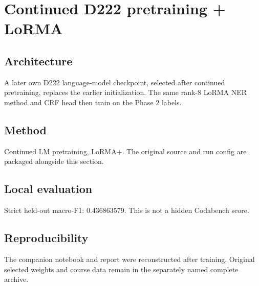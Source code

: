\section{Continued D222 pretraining + LoRMA}
\subsection{Architecture}
A later own D222 language-model checkpoint, selected after continued pretraining, replaces the earlier initialization. The same rank-8 LoRMA NER method and CRF head then train on the Phase 2 labels.
\subsection{Method}
Continued LM pretraining, LoRMA+. The original source and run config are packaged alongside this section.
\subsection{Local evaluation}
Strict held-out macro-F1: 0.436863579. This is not a hidden Codabench score.
\subsection{Reproducibility}
The companion notebook and report were reconstructed after training. Original selected weights and course data remain in the separately named complete archive.
